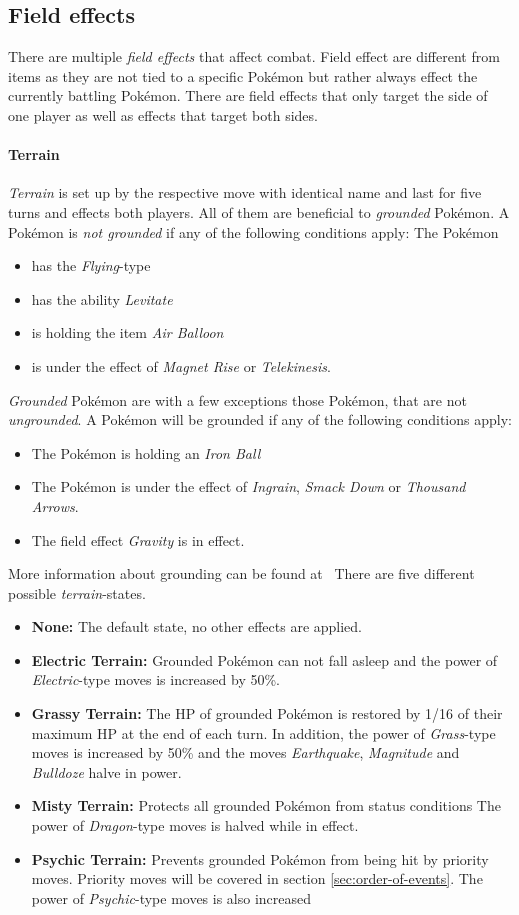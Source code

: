 \subsection{Field effects}
\label{sec:field-effects}
There are multiple \textit{field effects} that affect combat. Field effect are different from items as they are not
tied to a specific Pokémon but rather always effect the currently battling Pokémon. There are field effects that only
target the side of one player as well as effects that target both sides. 
\paragraph{Terrain}
\textit{Terrain} is set up by the respective move with identical name and last for five turns and effects both players.
All of them are beneficial to \textit{grounded} Pokémon. A Pokémon is \textit{not grounded} if any of the 
following conditions apply: The Pokémon
\begin{itemize}
	\item has the \textit{Flying}-type
	\item has the ability \textit{Levitate}
	\item is holding the item \textit{Air Balloon}
	\item is under the effect of \textit{Magnet Rise} or \textit{Telekinesis}.
\end{itemize}
\textit{Grounded} Pokémon are with a few exceptions those Pokémon, that are not \textit{ungrounded}. A 
Pokémon will be grounded if any of the following conditions apply:
\begin{itemize}
	\item The Pokémon is holding an \textit{Iron Ball}
	\item The Pokémon is under the effect of \textit{Ingrain}, \textit{Smack Down} or \textit{Thousand Arrows}.
	\item The field effect \textit{Gravity} is in effect.
\end{itemize}
More information about grounding can be found at~\autocite{Bulbapedia:Grounded}
There are five different possible \textit{terrain}-states. 
\begin{itemize}
	\item \textbf{None:} The default state, no other effects are applied. 
	\item \textbf{Electric Terrain:} Grounded Pokémon can not fall asleep and the power of \textit{Electric}-type
		moves is increased by 50\%.
	\item \textbf{Grassy Terrain:} The HP of grounded Pokémon is restored by 1/16 of their maximum HP at the
		end of each turn. In addition, the power of \textit{Grass}-type moves is increased by 50\% and the 
		moves \textit{Earthquake}, \textit{Magnitude} and \textit{Bulldoze} halve in power. 
	\item \textbf{Misty Terrain:} Protects all grounded Pokémon from status conditions
		The power of \textit{Dragon}-type moves is halved while in effect. 
	\item \textbf{Psychic Terrain:} Prevents grounded Pokémon from being hit by priority moves. Priority
	moves will be covered in section \ref{sec:order-of-events}. The power of \textit{Psychic}-type moves is also increased
\end{itemize}
